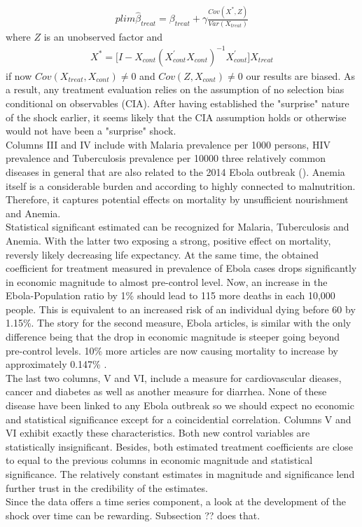 \documentclass{article}
\begin{document}
\begin{align*}
plim \widehat{\beta}_{treat} = \beta_{treat} + \gamma \frac{Cov(X^*,Z)}{Var(X_{treat})}
\end{align*} 
where $Z$ is an unobserved factor and 
\begin{align*}
X^* = \big[ I - X_{cont}(X^{'}_{cont} X_{cont})^{-1} X^{'}_{cont} \big] X_{treat}
\end{align*}
if now $Cov(X_{treat}, X_{cont}) \neq 0$ and $Cov(Z, X_{cont}) \neq 0$ our results are biased. As a result, any treatment evaluation relies on the assumption of no selection bias conditional on observables (CIA). After having established the "surprise" nature of the shock earlier, it seems likely that the CIA assumption holds or otherwise would not have been a "surprise" shock.\\
Columns III and IV include with Malaria prevalence per 1000 persons, HIV prevalence and Tuberculosis prevalence per 10000 three relatively common diseases in general that are also related to the 2014 Ebola outbreak (\cite{parpia2016effects}). Anemia itself is a considerable burden and according to \cite{ehrhardt2006malaria} highly connected to malnutrition. Therefore, it captures potential effects on mortality by unsufficient nourishment and Anemia. \\
Statistical significant estimated can be recognized for Malaria, Tuberculosis and Anemia. With the latter two exposing a strong, positive effect on mortality, reversly likely decreasing life expectancy. At the same time, the obtained coefficient for treatment measured in prevalence of Ebola cases drops significantly in economic magnitude to almost pre-control level. Now, an increase in the Ebola-Population ratio by 1\% should lead to 115 more deaths in each 10,000 people. This is equivalent to an increased risk of an individual dying before 60 by 1.15\%. 
The story for the second measure, Ebola articles, is similar with the only difference being that the drop in economic magnitude is steeper going beyond pre-control levels. 10\% more articles are now causing mortality to increase by approximately 0.147\% .\\
The last two columns, V and VI, include a measure for cardiovascular dieases, cancer and diabetes as well as another measure for diarrhea. None of these disease have been linked to any Ebola outbreak so we should expect no economic and statistical significance except for a coincidential correlation. Columns V and VI exhibit exactly these characteristics. Both new control variables are statistically insignificant. Besides, both estimated treatment coefficients are close to equal to the previous columns in economic magnitude and statistical significance. The relatively constant estimates in magnitude and significance lend further trust in the credibility of the estimates. \\
Since the data offers a time series component, a look at the development of the shock over time can be rewarding. Subsection ?? does that.
\end{document}
